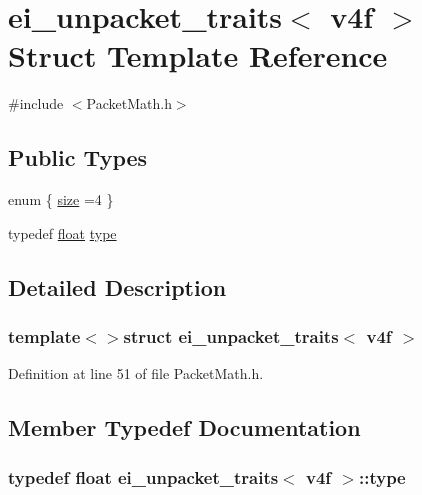 \hypertarget{structei__unpacket__traits_3_01v4f_01_4}{\section{ei\-\_\-unpacket\-\_\-traits$<$ v4f $>$ Struct Template Reference}
\label{structei__unpacket__traits_3_01v4f_01_4}
}


{\ttfamily \#include $<$Packet\-Math.\-h$>$}

\subsection*{Public Types}
\begin{DoxyCompactItemize}
\item 
enum \{ \hyperlink{structei__unpacket__traits_3_01v4f_01_4_a4e99531872859b60eebef7234a0d213dabe119704ef2b9a1be1dc7695a0119700}{size} =4
 \}
\item 
typedef \hyperlink{_super_l_u_support_8h_a6a1bb6ed41f44b60e7bd83b0e9945aa7}{float} \hyperlink{structei__unpacket__traits_3_01v4f_01_4_a0675841d65dc53b86943722462c817c1}{type}
\end{DoxyCompactItemize}


\subsection{Detailed Description}
\subsubsection*{template$<$$>$struct ei\-\_\-unpacket\-\_\-traits$<$ v4f $>$}



Definition at line 51 of file Packet\-Math.\-h.



\subsection{Member Typedef Documentation}
\hypertarget{structei__unpacket__traits_3_01v4f_01_4_a0675841d65dc53b86943722462c817c1}{
\subsubsection[{type}]{\setlength{\rightskip}{0pt plus 5cm}typedef {\bf float} {\bf ei\-\_\-unpacket\-\_\-traits}$<$ {\bf v4f} $>$\-::{\bf type}}}\label{structei__unpacket__traits_3_01v4f_01_4_a0675841d65dc53b86943722462c817c1}


